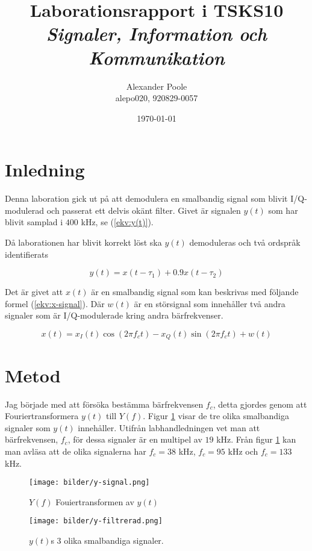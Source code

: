 \documentclass[10pt,twocolumn]{article}
\title{Laborationsrapport i TSKS10 \emph{Signaler, Information och Kommunikation}}
\author{Alexander Poole \\ alepo020, 920829-0057 }
\date{\today}
\begin{document}
\maketitle

\section{Inledning}

Denna laboration gick ut på att demodulera en smalbandig signal som blivit I/Q-modulerad och passerat ett delvis okänt filter. Givet är signalen $y(t)$ som har blivit samplad i $400$ kHz, se (\ref{ekv:y(t)}).

Då laborationen har blivit korrekt löst ska $y(t)$ demoduleras och två ordspråk identifierats 

\begin{equation}
y(t)=x(t-\tau_1)+0.9x(t-\tau_2)
\label{ekv:y(t)}
\end{equation} 

Det är givet att $x(t)$ är en smalbandig signal som kan beskrivas med följande formel (\ref{ekv:x-signal}). Där $w(t)$ är en störsignal som innehåller två andra signaler som är I/Q-modulerade kring andra bärfrekvenser.

\begin{equation}
x(t)=x_I(t)\cos(2\pi f_c t)-x_Q(t)\sin(2\pi f_c t)+w(t)
\label{ekv:x-signal}
\end{equation}
\section{Metod}

Jag började med att försöka bestämma bärfrekvensen $f_c$, detta gjordes genom att Fouriertransformera $y(t)$ till $Y(f)$. Figur \ref{fig:yf} visar de tre olika smalbandiga signaler som $y(t)$ innehåller. Utifrån labhandledningen vet man att bärfrekvensen, $f_c$, för dessa signaler är en multipel av $19$ kHz. Från figur \ref{fig:yf} kan man avläsa att de olika signalerna har $f_c=38$ kHz, $f_c=95$ kHz och $f_c=133$ kHz. 

\begin{figure}
\centering
\texttt{[image: bilder/y-signal.png]}
\caption{$Y(f)$ Fouiertransformen av $y(t)$}
\label{fig:yf}
\end{figure}

\begin{figure}
\centering
\texttt{[image: bilder/y-filtrerad.png]}
\caption{$y(t)$s $3$ olika smalbandiga signaler.}
\label{fig:y-filtrerad}
\end{figure}
\end{document}
